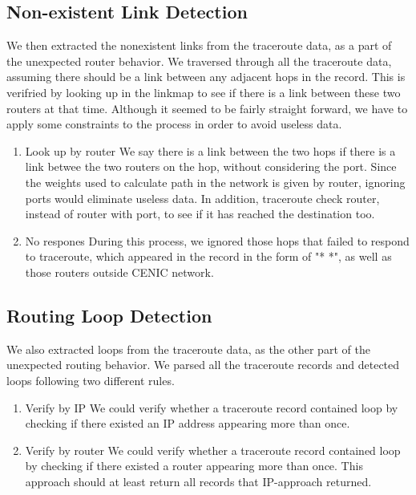 \documentclass[conference, twocolumn, oneside, 10pt]{IEEEtran}
\begin{document}
\subsection{Non-existent Link Detection}
We then extracted the nonexistent links from the traceroute data, as a part of the unexpected router behavior. We traversed through all the traceroute data, assuming there should be a link between any adjacent hops in the record. This is verifried by looking up in the linkmap to see if there is a link between these two routers at that time. Although it seemed to be fairly straight forward, we have to apply some constraints to the process in order to avoid useless data.

\begin{enumerate}

\item{Look up by router} We say there is a link between the two hops if there is a link betwee the two routers on the hop, without considering the port. Since the weights used to calculate path in the network is given by router, ignoring ports would eliminate useless data. In addition, traceroute check router, instead of router with port, to see if it has reached the destination too. 

\item{No respones} During this process, we ignored those hops that failed to respond to traceroute, which appeared in the record in the form of "* *", as well as those routers outside CENIC network. 

\end{enumerate}


\subsection{Routing Loop Detection}

We also extracted loops from the traceroute data, as the other part of the unexpected routing behavior. We parsed all the traceroute records and detected loops following two different rules. 
\begin{enumerate}
\item{Verify by IP} We could verify whether a traceroute record contained loop by checking if there existed an IP address appearing more than once. 
\item{Verify by router} We could verify whether a traceroute record contained loop by checking if there existed a router appearing more than once. This approach should at least return all records that IP-approach returned.
\end{enumerate}
\end{document}

